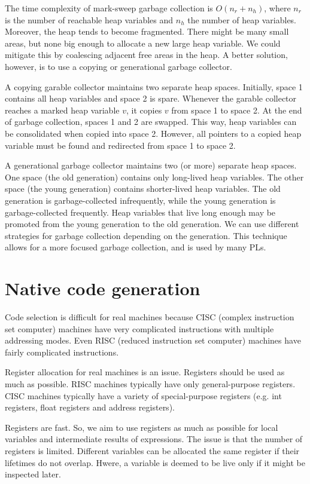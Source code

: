\documentclass[a4paper, openany]{memoir}
\begin{document}
The time complexity of mark-sweep garbage collection is $O(n_r + n_h)$, where $n_r$ is the number of reachable heap variables and $n_h$ the number of heap variables. Moreover, the heap tends to become fragmented. There might be many small areas, but none big enough to allocate a new large heap variable. We could mitigate this by coalescing adjacent free areas in the heap. A better solution, however, is to use a copying or generational garbage collector.

A copying garable collector maintains two separate heap spaces. Initially, space 1 contains all heap variables and space 2 is spare. Whenever the garable collector reaches a marked heap variable $v$, it copies $v$ from space 1 to space 2. At the end of garbage collection, spaces 1 and 2 are swapped. This way, heap variables can be consolidated when copied into space 2. However, all pointers to a copied heap variable must be found and redirected from space 1 to space 2.

A generational garbage collector maintains two (or more) separate heap spaces. One space (the old generation) contains only long-lived heap variables. The other space (the young generation) contains shorter-lived heap variables. The old generation is garbage-collected infrequently, while the young generation is garbage-collected frequently. Heap variables that live long enough may be promoted from the young generation to the old generation. We can use different strategies for garbage collection depending on the generation. This technique allows for a more focused garbage collection, and is used by many PLs. 

\newpage

\section{Native code generation}
Code selection is difficult for real machines because CISC (complex instruction set computer) machines have very complicated instructions with multiple addressing modes. Even RISC (reduced instruction set computer) machines have fairly complicated instructions.

Register allocation for real machines is an issue. Registers should be used as much as possible. RISC machines typically have only general-purpose registers. CISC machines typically have a variety of special-purpose registers (e.g. int registers, float registers and address registers).

Registers are fast. So, we aim to use registers as much as possible for local variables and intermediate results of expressions. The issue is that the number of registers is limited. Different variables can be allocated the same register if their lifetimes do not overlap. Hwere, a variable is deemed to be live only if it might be inspected later.
\end{document}
